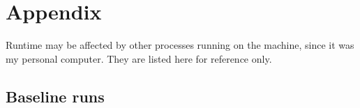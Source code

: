 \appendix

\section{Appendix}

Runtime may be affected by other processes running on the machine, since it was my personal computer. They are listed here for reference only.

\subsection{Baseline runs}
\label{appendix:baseline}


